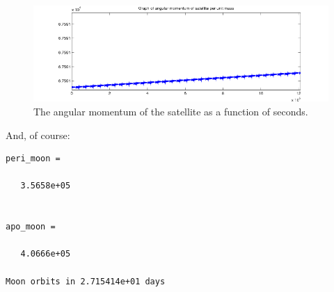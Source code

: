 \documentclass{article}
\begin{document}
\begin{figure}[H]\centering
  \includegraphics[width=\textwidth]{satellitemomentum.png}
  \caption{The angular momentum of the satellite as a function of
    seconds.}
  \label{fig:momentum}
\end{figure}

\noindent
And, of course:
\begin{verbatim}
peri_moon =

   3.5658e+05


apo_moon =

   4.0666e+05

Moon orbits in 2.715414e+01 days
\end{verbatim}
\end{document}

